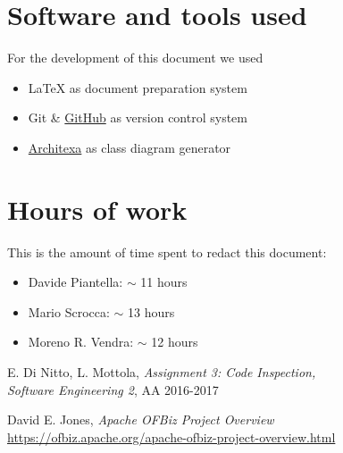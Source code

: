 \begin{appendices}

	\section{Software and tools used}
	For the development of this document we used
	\begin{itemize}
		\item \LaTeX{} as document preparation system 
		\item Git \& \href{http://github.com}{GitHub} as version control system
		\item \href{http://www.architexa.com}{Architexa} as class diagram generator
	\end{itemize}
	
	\section{Hours of work}
	This is the amount of time spent to redact this document:
	\begin{itemize}
		\item Davide Piantella: $\sim$ 11 hours
		\item Mario Scrocca: $\sim$ 13 hours
		\item Moreno R. Vendra: $\sim$ 12 hours
	\end{itemize}
	
\end{appendices}


\begin{thebibliography}{9}

 E. Di Nitto, L. Mottola, \emph{Assignment 3: Code Inspection, \\Software Engineering 2}, AA 2016-2017

 David E. Jones, \emph{Apache OFBiz Project Overview}\\
\url{https://ofbiz.apache.org/apache-ofbiz-project-overview.html}

\end{thebibliography}